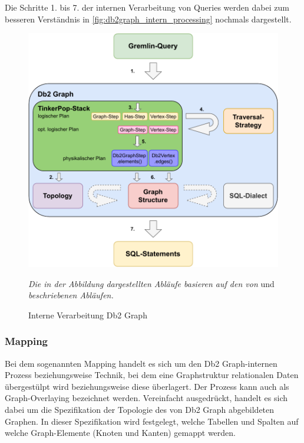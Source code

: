 Die Schritte 1. bis 7. der internen Verarbeitung von Queries werden dabei zum besseren Verständnis in \autoref{fig:db2graph_intern_processing} nochmals dargestellt.

\begin{figure}[ht]
    \centering
    \includegraphics[width=\textwidth]{images/db2graph_intern_processing.pdf}
    \caption{Interne Verarbeitung Db2 Graph}
    \label{fig:db2graph_intern_processing}
    \vspace{1em}
    \textit{Die in der Abbildung dargestellten Abläufe basieren auf den von}  und  \textit{beschriebenen Abläufen.} 
\end{figure}

\subsubsection{Mapping}
Bei dem sogenannten Mapping handelt es sich um den Db2 Graph-internen Prozess beziehungsweise Technik, bei dem eine Graphstruktur relationalen Daten übergestülpt wird beziehungsweise diese überlagert. Der Prozess kann auch als Graph-Overlaying bezeichnet werden. Vereinfacht ausgedrückt, handelt es sich dabei um die Spezifikation der Topologie des von Db2 Graph abgebildeten Graphen. In dieser Spezifikation wird festgelegt, welche Tabellen und Spalten auf welche Graph-Elemente (Knoten und Kanten) gemappt werden. 

